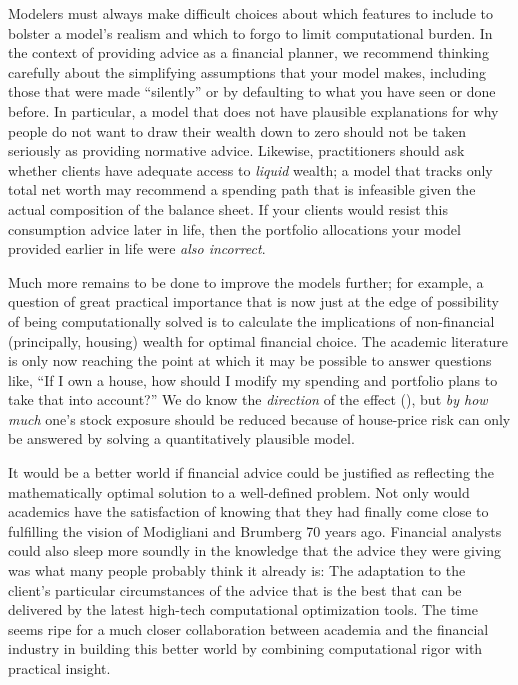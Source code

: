 \documentclass[12pt,letterpaper, fleqn]{article}
\begin{document}
Modelers must always make difficult choices about which features to include to bolster a model's realism and which to forgo to limit computational burden.
In the context of providing advice as a financial planner, we recommend thinking carefully about the simplifying assumptions that your model makes, including those that were made ``silently'' or by defaulting to what you have seen or done before.
In particular, a model that does not have plausible explanations for why people do not want to draw their wealth down to zero should not be taken seriously as providing normative advice.
Likewise, practitioners should ask whether clients have adequate access to \textit{liquid} wealth; a model that tracks only total net worth may recommend a spending path that is infeasible given the actual composition of the balance sheet.
If your clients would resist this consumption advice later in life, then the portfolio allocations your model provided earlier in life were \textit{also incorrect}.

Much more remains to be done to improve the models further; for example, a question of great practical importance that is now just at the edge of possibility of being computationally solved is to calculate the implications of non-financial (principally, housing) wealth for optimal financial choice.
The academic literature is only now reaching the point at which it may be possible to answer questions like, ``If I own a house, how should I modify my spending and portfolio plans to take that into account?''
We do know the \textit{direction} of the effect (\cite{kimballStandardRA}),
but \textit{by how much} one's stock exposure should be reduced because of house-price risk can only be answered by solving a quantitatively plausible model.

It would be a better world if financial advice could be justified as reflecting the mathematically optimal solution to a well-defined problem.
Not only would academics have the satisfaction of knowing that they had finally come close to fulfilling the vision of Modigliani and Brumberg 70 years ago.
Financial analysts could also sleep more soundly in the knowledge that the advice they were giving was what many people probably think it already is: The adaptation to the client's particular circumstances of the advice that is the best that can be delivered by the latest high-tech computational optimization tools.
The time seems ripe for a much closer collaboration between academia and the financial industry in building this better world by combining computational rigor with practical insight.
\end{document}

